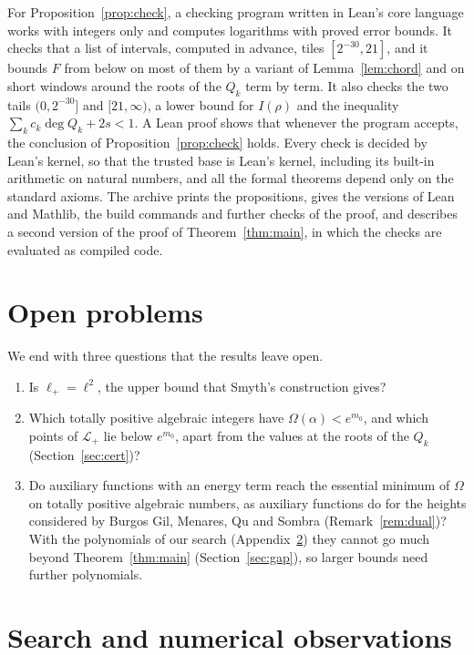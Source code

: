 \documentclass[11pt]{amsart}
\theoremstyle{remark}
\numberwithin{equation}{section}
\begin{document}
For Proposition~\ref{prop:check}, a checking program written in Lean's core language works with integers only and computes logarithms with proved error bounds. It checks that a list of intervals, computed in advance, tiles $[2^{-30},21]$, and it bounds $F$ from below on most of them by a variant of Lemma~\ref{lem:chord} and on short windows around the roots of the $Q_k$ term by term. It also checks the two tails $(0,2^{-30}]$ and $[21,\infty)$, a lower bound for $I(\rho)$ and the inequality $\sum_kc_k\deg Q_k+2s<1$. A Lean proof shows that whenever the program accepts, the conclusion of Proposition~\ref{prop:check} holds. Every check is decided by Lean's kernel, so that the trusted base is Lean's kernel, including its built-in arithmetic on natural numbers, and all the formal theorems depend only on the standard axioms. The archive prints the propositions, gives the versions of Lean and Mathlib, the build commands and further checks of the proof, and describes a second version of the proof of Theorem~\ref{thm:main}, in which the checks are evaluated as compiled code.

\section{Open problems}\label{sec:open}
We end with three questions that the results leave open.
\begin{enumerate}[leftmargin=2em]
\item Is $\ell_+=\ell^2$, the upper bound that Smyth's construction gives?
\item Which totally positive algebraic integers have $\Omega(\alpha)<e^{m_0}$, and which points of $\mathcal L_+$ lie below $e^{m_0}$, apart from the values at the roots of the $Q_k$ (Section~\ref{sec:cert})?
\item Do auxiliary functions with an energy term reach the essential minimum of $\Omega$ on totally positive algebraic numbers, as auxiliary functions do for the heights considered by Burgos Gil, Menares, Qu and Sombra (Remark~\ref{rem:dual})? With the polynomials of our search (Appendix~\ref{sec:obs}) they cannot go much beyond Theorem~\ref{thm:main} (Section~\ref{sec:gap}), so larger bounds need further polynomials.
\end{enumerate}

\appendix
\section{Search and numerical observations}\label{sec:obs}
\end{document}
